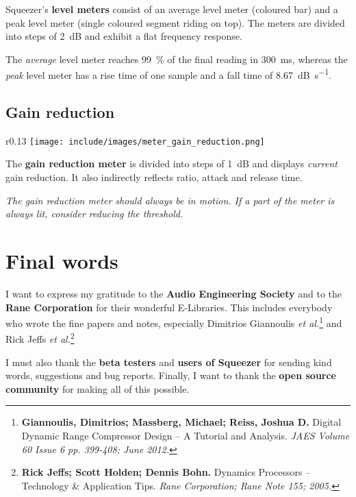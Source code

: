 Squeezer's \textbf{level meters} consist of an average level meter
(coloured bar) and a peak level meter (single coloured segment riding
on top).  The meters are divided into steps of \SI{2}{\dB} and exhibit
a flat frequency response.

The \emph{average} level meter reaches \SI{99}{\percent} of the final
reading in \SI{300}{\milli\second}, whereas the \emph{peak} level
meter has a rise time of one sample and a fall time of
\SI{8.67}{\dB\per\second}.

\section{Gain reduction}

\begin{wrapfigure}{r}{0.13\linewidth}
\texttt{[image: include/images/meter\_gain\_reduction.png]}
\end{wrapfigure}

The \textbf{gain reduction meter} is divided into steps of \SI{1}{\dB}
and displays \emph{current} gain reduction.  It also indirectly
reflects ratio, attack and release time.

\emph{The gain reduction meter should always be in motion.  If a part
  of the meter is always lit, consider reducing the threshold.}

\chapter{Final words}
\label{chap:final_words}

I want to express my gratitude to the \textbf{Audio Engineering
  Society} and to the \textbf{Rane Corporation} for their wonderful
E-Libraries.  This includes everybody who wrote the fine papers and
notes, especially Dimitrios Giannoulis \emph{et
  al.}\footnote{\textbf{Giannoulis, Dimitrios; Massberg, Michael;
    Reiss, Joshua D.}  Digital Dynamic Range Compressor Design -- A
  Tutorial and Analysis. \emph{JAES Volume 60 Issue 6 pp. 399-408;
    June 2012.}} and Rick Jeffs \emph{et al.}\footnote{\textbf{Rick
    Jeffs; Scott Holden; Dennis Bohn.}  Dynamics Processors --
  Technology \& Application Tips.  \emph{Rane Corporation; Rane Note
    155; 2005.}}

I must also thank the \textbf{beta testers} and \textbf{users of
  Squeezer} for sending kind words, suggestions and bug reports.
Finally, I want to thank the \textbf{open source community} for making
all of this possible.

